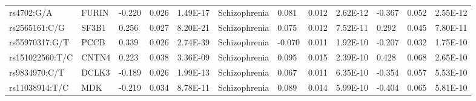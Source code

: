 \begin{table}[]
{\begin{tabular}{llllllllllll}
		\rowcolor[HTML]{BEBEBE}rs4702:G/A                       & FURIN                             & -0.220                            & 0.026                           & 1.49E-17                       & Schizophrenia                              & 0.081                             & 0.012                           & 2.62E-12                       & -0.367                          & 0.052                           & 2.55E-12                       \\
		\rowcolor[HTML]{BEBEBE}rs2565161:C/G                    & SF3B1                             & 0.256                             & 0.027                           & 8.20E-21                       & Schizophrenia                              & 0.075                             & 0.012                           & 7.52E-11                       & 0.292                           & 0.045                           & 7.80E-11                       \\
		\rowcolor[HTML]{BEBEBE}rs55970317:G/T                   & PCCB                              & 0.339                             & 0.026                           & 2.74E-39                       & Schizophrenia                              & -0.070                            & 0.011                           & 1.92E-10                       & -0.207                          & 0.032                           & 1.75E-10                       \\
		\rowcolor[HTML]{BEBEBE}rs151022560:T/C                  & CNTN4                             & 0.223                             & 0.038                           & 3.36E-09                       & Schizophrenia                              & 0.095                             & 0.015                           & 2.39E-10                       & 0.428                           & 0.068                           & 2.65E-10                       \\
		\rowcolor[HTML]{BEBEBE}rs9834970:C/T                    & DCLK3                             & -0.189                            & 0.026                           & 1.99E-13                       & Schizophrenia                              & 0.067                             & 0.011                           & 6.35E-10                       & -0.354                          & 0.057                           & 5.53E-10                       \\
		\rowcolor[HTML]{BEBEBE}rs11038914:T/C                   & MDK                               & -0.219                            & 0.034                           & 8.78E-11                       & Schizophrenia                              & 0.089                             & 0.014                           & 5.99E-10                       & -0.404                          & 0.065                           & 5.81E-10                       \\

\end{tabular}}
\end{table}
